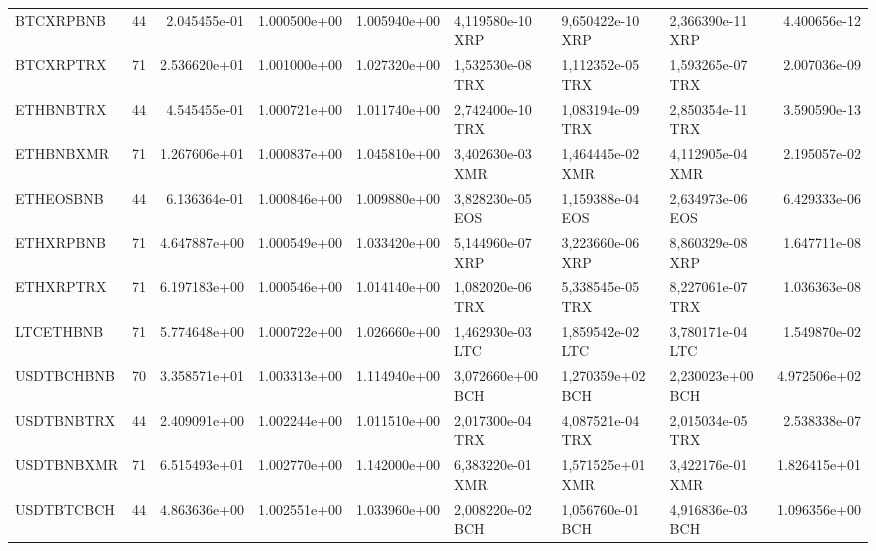 \begin{tabular}{lrrrrlllr}
  BTCXRPBNB &    44 &   2.045455e-01 &   1.000500e+00 &    1.005940e+00 &  4,119580e-10 XRP &   9,650422e-10 XRP &           2,366390e-11 XRP &                      4.400656e-12 \\
  BTCXRPTRX &    71 &   2.536620e+01 &   1.001000e+00 &    1.027320e+00 &  1,532530e-08 TRX &   1,112352e-05 TRX &           1,593265e-07 TRX &                      2.007036e-09 \\
  ETHBNBTRX &    44 &   4.545455e-01 &   1.000721e+00 &    1.011740e+00 &  2,742400e-10 TRX &   1,083194e-09 TRX &           2,850354e-11 TRX &                      3.590590e-13 \\
  ETHBNBXMR &    71 &   1.267606e+01 &   1.000837e+00 &    1.045810e+00 &  3,402630e-03 XMR &   1,464445e-02 XMR &           4,112905e-04 XMR &                      2.195057e-02 \\
  ETHEOSBNB &    44 &   6.136364e-01 &   1.000846e+00 &    1.009880e+00 &  3,828230e-05 EOS &   1,159388e-04 EOS &           2,634973e-06 EOS &                      6.429333e-06 \\
  ETHXRPBNB &    71 &   4.647887e+00 &   1.000549e+00 &    1.033420e+00 &  5,144960e-07 XRP &   3,223660e-06 XRP &           8,860329e-08 XRP &                      1.647711e-08 \\
  ETHXRPTRX &    71 &   6.197183e+00 &   1.000546e+00 &    1.014140e+00 &  1,082020e-06 TRX &   5,338545e-05 TRX &           8,227061e-07 TRX &                      1.036363e-08 \\
  LTCETHBNB &    71 &   5.774648e+00 &   1.000722e+00 &    1.026660e+00 &  1,462930e-03 LTC &   1,859542e-02 LTC &           3,780171e-04 LTC &                      1.549870e-02 \\
 USDTBCHBNB &    70 &   3.358571e+01 &   1.003313e+00 &    1.114940e+00 &  3,072660e+00 BCH &   1,270359e+02 BCH &           2,230023e+00 BCH &                      4.972506e+02 \\
 USDTBNBTRX &    44 &   2.409091e+00 &   1.002244e+00 &    1.011510e+00 &  2,017300e-04 TRX &   4,087521e-04 TRX &           2,015034e-05 TRX &                      2.538338e-07 \\
 USDTBNBXMR &    71 &   6.515493e+01 &   1.002770e+00 &    1.142000e+00 &  6,383220e-01 XMR &   1,571525e+01 XMR &           3,422176e-01 XMR &                      1.826415e+01 \\
 USDTBTCBCH &    44 &   4.863636e+00 &   1.002551e+00 &    1.033960e+00 &  2,008220e-02 BCH &   1,056760e-01 BCH &           4,916836e-03 BCH &                      1.096356e+00 \\

\end{tabular}
